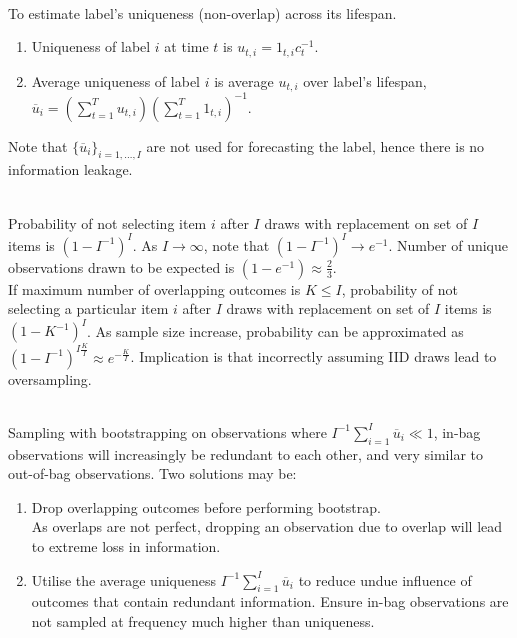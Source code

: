 \begin{method} \\
To estimate label's uniqueness (non-overlap) across its lifespan.
\begin{enumerate}[label=\roman*.]
\setlength{\itemsep}{0pt}
\item Uniqueness of label $i$ at time $t$ is $u_{t,i} = 1_{t,i} c^{-1}_{t}$.
\item Average uniqueness of label $i$ is average $u_{t,i}$ over label's lifespan, $\overline{u}_i = (\sum_{t=1}^T u_{t,i}) (\sum_{t=1}^T 1_{t,i})^{-1}$.
\end{enumerate}
Note that $\{\overline{u}_{i}\}_{i=1, \ldots, I}$ are not used for forecasting the label, hence there is no information leakage.
\end{method}

\begin{remark} \\
Probability of not selecting item $i$ after $I$ draws with replacement on set of $I$ items is $(1 - I^{-1})^I$. As $I \rightarrow \infty$, note that $(1 - I^{-1})^I \rightarrow e^{-1}$. Number of unique observations drawn to be expected is $(1- e^{-1}) \approx \frac{2}{3}$.\\
If maximum number of overlapping outcomes is $K \leq I$, probability of not selecting a particular item $i$ after $I$ draws with replacement on set of $I$ items is $(1 - K^{-1})^I$. As sample size increase, probability can be approximated as $(1-I^{-1})^{I \frac{K}{I}} \approx e^{-\frac{K}{I}}$. Implication is that incorrectly assuming IID draws lead to oversampling.
\end{remark}

\begin{method} \\
Sampling with bootstrapping on observations where $I^{-1} \sum_{i=1}^{I} \overline{u}_i \ll 1$, in-bag observations will increasingly be redundant to each other, and very similar to out-of-bag observations. Two solutions may be:
\begin{enumerate}[label=\roman*.]
\setlength{\itemsep}{0pt}
\item Drop overlapping outcomes before performing bootstrap.\\
As overlaps are not perfect, dropping an observation due to overlap will lead to extreme loss in information.
\item Utilise the average uniqueness $I^{-1} \sum_{i=1}^{I} \overline{u}_i$ to reduce undue influence of outcomes that contain redundant information. Ensure in-bag observations are not sampled at frequency much higher than uniqueness.
\end{enumerate}
\end{method}

